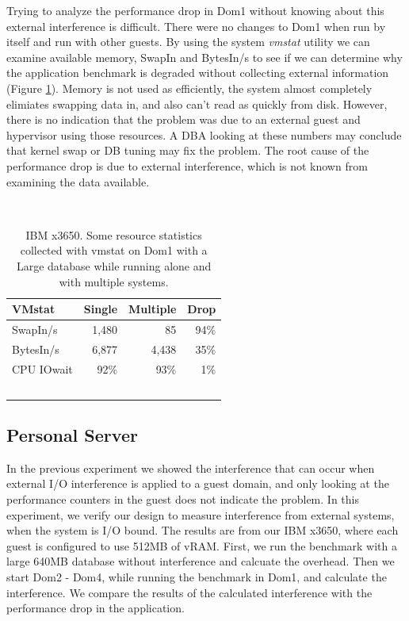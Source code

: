 Trying to analyze the performance drop in Dom1 without knowing about this external interference is difficult.  There were no changes to Dom1 when run by itself and run with other guests.  By using the system \emph{vmstat} utility we can examine available memory, SwapIn and BytesIn/s to see if we can determine why the application benchmark is degraded without collecting external information (Figure \ref{fig:vmstat}).  Memory is not used as efficiently, the system almost completely elimiates swapping data in, and also can't read as quickly from disk.  However, there is no indication that the problem was due to an external guest and hypervisor using those resources.  A DBA looking at these numbers may conclude that kernel swap or DB tuning may fix the problem.  
The root cause of the performance drop is due to external interference, which is not known from examining the data available.

\begin{table}[h]
  \begin{tabular}{ l | r | r | r }
    VMstat & Single & Multiple & Drop \\ \hline
	SwapIn/s & 1,480 & 85 & 94\% \\
	BytesIn/s & 6,877 & 4,438 & 35\% \\
	CPU IOwait & 92\% & 93\% & 1\% \\
  \end{tabular}
\caption{IBM x3650.  Some resource statistics collected with vmstat on Dom1 with a Large database while running alone and with multiple systems.} 
\label{fig:vmstat}
\end{table}

\subsection{Personal Server}
In the previous experiment we showed the interference that can occur when external I/O interference is applied to a guest domain, and only looking at the performance counters in the guest does not indicate the problem.  In this experiment, we verify our design to measure interference from external systems, when the system is I/O bound.  The results are from our IBM x3650, where each guest is configured to use 512MB of vRAM.  First, we run the benchmark with a large 640MB database without interference and calcuate the overhead.  Then we start Dom2 - Dom4, while running the benchmark in Dom1, and calculate the interference.  We compare the results of the calculated interference with the performance drop in the application.

